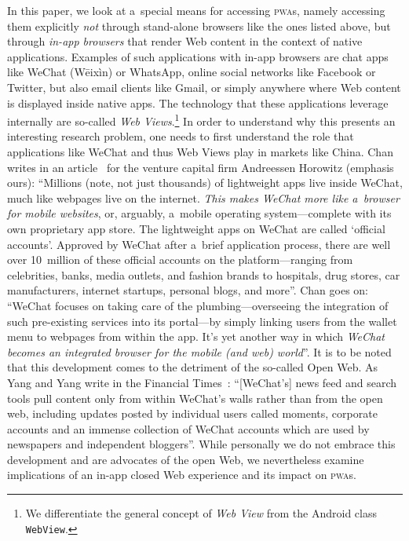 \documentclass[sigconf]{acmart}
\begin{document}
In this paper, we look at a~special means for accessing \textsc{pwa}s,
namely accessing them explicitly \emph{not} through stand-alone browsers
like the ones listed above,
but through \emph{in-app browsers} that render Web content in the context of native applications.
Examples of such applications with in-app browsers are chat apps like WeChat (Wēixìn) or WhatsApp,
online social networks like Facebook or Twitter, but also email clients like Gmail,
or simply anywhere where Web content is displayed inside native apps.
The technology that these applications leverage internally are so-called
\emph{Web Views}.\footnote{We differentiate the general concept of \emph{Web View}
from the Android class \texttt{WebView}.}
In order to understand why this presents an interesting research problem,
one needs to first understand the role that applications like WeChat
and thus Web Views play in markets like China.
Chan writes in an article~\cite{chan2015wechat}
for the venture capital firm Andreessen Horowitz (emphasis ours):
``Millions (note, not just thousands) of lightweight apps live inside WeChat,
much like webpages live on the internet.
\emph{This makes WeChat more like a~browser for mobile websites}, or, arguably,
a~mobile operating system---complete with its own proprietary app store.
The lightweight apps on WeChat are called `official accounts'.
Approved by WeChat after a~brief application process,
there are well over 10~million of these official accounts on the platform---ranging
from celebrities, banks, media outlets, and fashion brands to hospitals, drug stores,
car manufacturers, internet startups, personal blogs, and more''.
Chan goes on: ``WeChat focuses on taking care of the plumbing---overseeing
the integration of such pre-existing services into its portal---by
simply linking users from the wallet menu to webpages from within the app.
It's yet another way in which \emph{WeChat
becomes an integrated browser for the mobile (and web) world}''.
It is to be noted that this development comes to the detriment of the so-called Open Web.
As Yang and Yang write in the Financial Times~\cite{yang2017tencent}:
``[WeChat's] news feed and search tools pull content only from within WeChat's walls
rather than from the open web, including updates posted by individual users called moments,
corporate accounts and an immense collection of WeChat accounts
which are used by newspapers and independent bloggers''.
While personally we do not embrace this development
and are advocates of the open Web,
we nevertheless examine implications of an in-app closed Web experience
and its impact on \textsc{pwa}s. 
\end{document}

